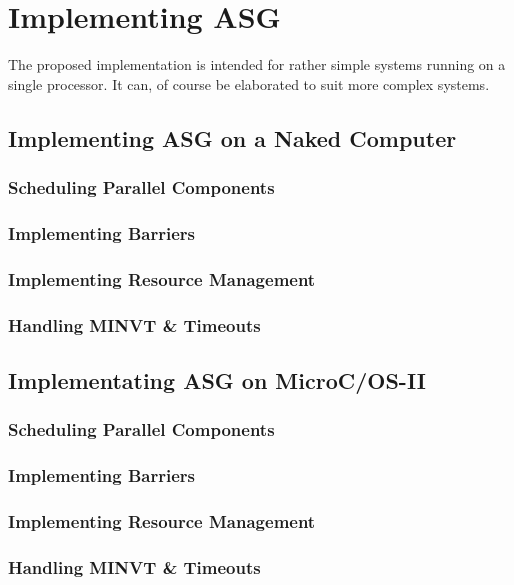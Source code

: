\documentclass[../main.tex]{subfiles}
\begin{document}
\chapter{Implementing ASG }
The proposed implementation is intended for rather simple systems running on a single processor. It can, of course be elaborated to suit more complex systems.

\section{Implementing ASG on a Naked Computer}

\subsection{Scheduling Parallel Components}
\subsection{Implementing Barriers}
\subsection{Implementing Resource Management}
\subsection{Handling MINVT \& Timeouts}

\section{Implementating ASG on MicroC/OS-II}

\subsection{Scheduling Parallel Components}
\subsection{Implementing Barriers}
\subsection{Implementing Resource Management}
\subsection{Handling MINVT \& Timeouts}
\end{document}
